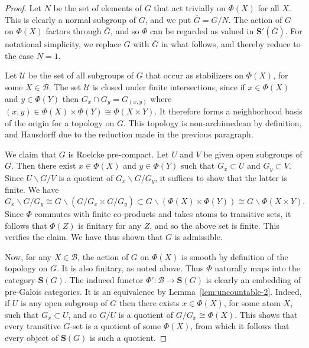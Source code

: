 \documentclass[12pt]{amsart}
\numberwithin{equation}{section}
\theoremstyle{definition}
\newcommand{\cB}{\mathcal{B}}
\newcommand{\bS}{\mathbf{S}}
\newcommand{\cU}{\mathcal{U}}
\begin{document}
\begin{proof}
Let $N$ be the set of elements of $G$ that act trivially on $\Phi(X)$ for all $X$. This is clearly a normal subgroup of $G$, and we put $\overline{G}=G/N$. The action of $G$ on $\Phi(X)$ factors through $\overline{G}$, and so $\Phi$ can be regarded as valued in $\bS'(\overline{G})$. For notational simplicity, we replace $G$ with $\overline{G}$ in what follows, and thereby reduce to the case $N=1$.

Let $\cU$ be the set of all subgroups of $G$ that occur as stabilizers on $\Phi(X)$, for some $X \in \cB$. The set $\cU$ is closed under finite intersections, since if $x \in \Phi(X)$ and $y \in \Phi(Y)$ then $G_x \cap G_y = G_{(x,y)}$ where $(x,y) \in \Phi(X) \times \Phi(Y) \cong \Phi(X \times Y)$. It therefore forms a neighborhood basis of the origin for a topology on $G$. This topology is non-archimedean by definition, and Hausdorff due to the reduction made in the previous paragraph.

We claim that $G$ is Roelcke pre-compact. Let $U$ and $V$ be given open subgroups of $G$. Then there exist $x \in \Phi(X)$ and $y \in \Phi(Y)$ such that $G_x \subset U$ and $G_y \subset V$. Since $U \backslash G /V$ is a quotient of $G_x \backslash G/G_y$, it suffices to show that the latter is finite. We have
\begin{displaymath}
G_x \backslash G/G_y  \cong G \backslash (G/G_x \times G/G_y) \subset G \backslash (\Phi(X) \times \Phi(Y)) \cong G \backslash \Phi(X \times Y).
\end{displaymath}
Since $\Phi$ commutes with finite co-products and takes atoms to transitive sets, it follows that $\Phi(Z)$ is finitary for any $Z$, and so the above set is finite. This verifies the claim. We have thus shown that $G$ is admissible.

Now, for any $X \in \cB$, the action of $G$ on $\Phi(X)$ is smooth by definition of the topology on $G$. It is also finitary, as noted above. Thus $\Phi$ naturally maps into the category $\bS(G)$. The induced functor $\Phi' \colon \cB \to \bS(G)$ is clearly an embedding of pre-Galois categories. It is an equivalence by Lemma~\ref{lem:uncountable-2}. Indeed, if $U$ is any open subgroup of $G$ then there exists $x \in \Phi(X)$, for some atom $X$, such that $G_x \subset U$, and so $G/U$ is a quotient of $G/G_x \cong \Phi(X)$. This shows that every transitive $G$-set is a quotient of some $\Phi(X)$, from which it follows that every object of $\bS(G)$ is such a quotient.
\end{proof}
\end{document}
